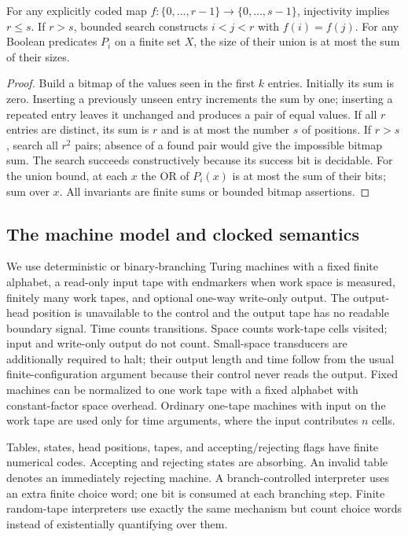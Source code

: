 \begin{lemma}\label{thm:F04}
For any explicitly coded map $f:\{0,\ldots,r-1\}\to\{0,\ldots,s-1\}$, injectivity implies $r\le s$. If $r>s$, bounded search constructs $i<j<r$ with $f(i)=f(j)$. For any Boolean predicates $P_i$ on a finite set $X$, the size of their union is at most the sum of their sizes.
\end{lemma}
\begin{proof}
Build a bitmap of the values seen in the first $k$ entries. Initially its sum is zero. Inserting a previously unseen entry increments the sum by one; inserting a repeated entry leaves it unchanged and produces a pair of equal values. If all $r$ entries are distinct, its sum is $r$ and is at most the number $s$ of positions. If $r>s$, search all $r^2$ pairs; absence of a found pair would give the impossible bitmap sum. The search succeeds constructively because its success bit is decidable. For the union bound, at each $x$ the OR of $P_i(x)$ is at most the sum of their bits; sum over $x$. All invariants are finite sums or bounded bitmap assertions.
\end{proof}

\subsection{The machine model and clocked semantics}
We use deterministic or binary-branching Turing machines with a fixed finite alphabet, a read-only input tape with endmarkers when work space is measured, finitely many work tapes, and optional one-way write-only output. The output-head position is unavailable to the control and the output tape has no readable boundary signal. Time counts transitions. Space counts work-tape cells visited; input and write-only output do not count. Small-space transducers are additionally required to halt; their output length and time follow from the usual finite-configuration argument because their control never reads the output. Fixed machines can be normalized to one work tape with a fixed alphabet with constant-factor space overhead. Ordinary one-tape machines with input on the work tape are used only for time arguments, where the input contributes $n$ cells.

Tables, states, head positions, tapes, and accepting/rejecting flags have finite numerical codes. Accepting and rejecting states are absorbing. An invalid table denotes an immediately rejecting machine. A branch-controlled interpreter uses an extra finite choice word; one bit is consumed at each branching step. Finite random-tape interpreters use exactly the same mechanism but count choice words instead of existentially quantifying over them.

